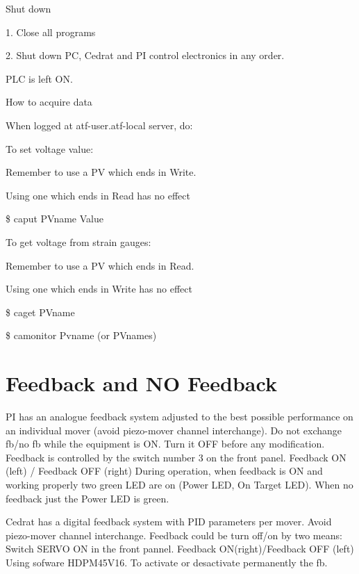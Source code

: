 Shut down\par
1. Close all programs\par
2. Shut down PC, Cedrat and PI control electronics in any order.\par
PLC is left ON.\par
How to acquire data\par
When logged at atf-user.atf-local server, do:\par
To set voltage value:\par
Remember to use a PV which ends in Write.\par
Using one which ends in Read has no effect\par
\$ caput PVname Value\par
To get voltage from strain gauges:\par
Remember to use a PV which ends in Read.\par
Using one which ends in Write has no effect\par
\$ caget PVname\par
\$ camonitor Pvname (or PVnames)\par

\section{Feedback and NO Feedback}
PI has an analogue feedback system adjusted to the best possible performance on an individual mover (avoid piezo-mover channel interchange). Do not exchange fb/no fb while the equipment is ON. Turn it OFF before any modification. 
Feedback is controlled by the switch number 3  on the front panel. 
Feedback ON (left) / Feedback OFF (right)
During operation, when feedback is ON and working properly two green LED are on (Power LED, On Target LED). When no feedback just the Power LED is green.

Cedrat has a digital feedback system with PID parameters per mover. Avoid piezo-mover channel interchange. Feedback could be turn off/on by two means:
Switch SERVO ON in the front pannel. Feedback ON(right)/Feedback OFF (left)
Using sofware  HDPM45V16. To activate or desactivate permanently the fb.\par 

